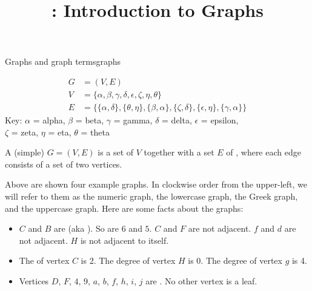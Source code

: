 \documentclass{tufte-handout}
\title{\thecourse: Introduction to Graphs}
\date{}
\begin{document}
\maketitle

\begin{model}{Graphs and graph terms}{graphs}
  \begin{center}
  \begin{minipage}{0.45\textwidth}
    
  \end{minipage}
  \begin{minipage}{0.45\textwidth}
    
  \end{minipage}

  \vspace{1em}
  \begin{minipage}{0.45\textwidth}
    
  \end{minipage}
  \begin{minipage}{0.45\textwidth}
    \begin{align*}
      G &= (V,E) \\
      V &= \{\alpha, \beta, \gamma, \delta, \epsilon, \zeta, \eta,
          \theta\} \\
      E &= \{\{\alpha, \delta\}, \{\theta, \eta\}, \{\beta, \alpha\},
          \{\zeta, \delta\}, \{\epsilon, \eta\}, \{\gamma, \alpha\}\}
    \end{align*}
    {\scriptsize
      Key: $\alpha$ = alpha, $\beta$ = beta, $\gamma$ = gamma, $\delta$ =
      delta, $\epsilon$ = epsilon, \\ $\zeta$ = zeta, $\eta$ = eta,
      $\theta$ = theta
    }
  \end{minipage}
  \end{center}

  \vspace{1em}
  \begin{defn}
    A (simple)  $G = (V,E)$ is a set of  $V$
    together with a set $E$ of , where each edge consists
    of a set of two vertices.
  \end{defn}

  Above are shown four example graphs.  In clockwise order from the
  upper-left, we will refer to them as the numeric graph, the
  lowercase graph, the Greek graph, and the uppercase graph.  Here are
  some facts about the graphs:

  \begin{itemize}
  \item $C$ and $B$ are  (aka ).  So
    are $6$ and $5$.  $C$ and $F$ are not adjacent.  $f$ and $d$ are
    not adjacent.  $H$ is not adjacent to itself.
  \item The  of vertex $C$ is 2.  The degree of vertex $H$ is
    0.  The degree of vertex $g$ is 4.
  \item Vertices $D$, $F$, $4$, $9$, $a$, $b$, $f$, $h$, $i$, $j$ are
    .  No other vertex is a leaf.
  \end{itemize}
\end{model}
\end{document}
